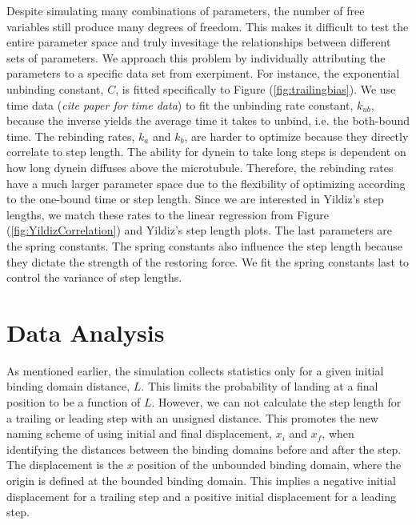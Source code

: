 Despite simulating many combinations of parameters, the number of free variables still produce many degrees of freedom. This makes it difficult to test the entire parameter space and truly invesitage the relationships between different sets of parameters. We approach this problem by individually attributing the parameters to a specific data set from exerpiment. For instance, the exponential unbinding constant, $C$, is fitted specifically to Figure (\ref{fig:trailingbias}). We use time data (\textit{cite paper for time data}\cite{}) to fit the unbinding rate constant, $k_{ub}$, because the inverse yields the average time it takes to unbind, i.e. the both-bound time. The rebinding rates, $k_a$ and $k_b$, are harder to optimize because they directly correlate to step length. The ability for dynein to take long steps is dependent on how long dynein diffuses above the microtubule. Therefore, the rebinding rates have a much larger parameter space due to the flexibility of optimizing according to the one-bound time or step length. Since we are interested in Yildiz's step lengths, we match these rates to the linear regression from Figure (\ref{fig:YildizCorrelation}) and Yildiz's step length plots. The last parameters are the spring constants. The spring constants also influence the step length because they dictate the strength of the restoring force. We fit the spring constants last to control the variance of step lengths.




\section{Data Analysis} \label{sec:DataAna}
As mentioned earlier, the simulation collects statistics only for a given initial binding domain distance, $L$. This limits the probability of landing at a final position to be a function of $L$. However, we can not calculate the step length for a trailing or leading step with an unsigned distance. This promotes the new naming scheme of using initial and final displacement, $x_i$ and $x_f$, when identifying the distances between the binding domains before and after the step. The displacement is the $x$ position of the unbounded binding domain, where the origin is defined at the bounded binding domain. This implies a negative initial displacement for a trailing step and a positive initial displacement for a leading step. 

